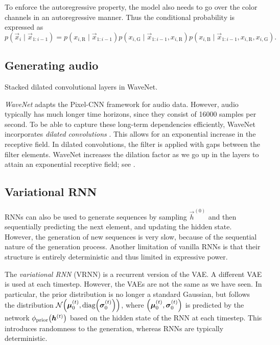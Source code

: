 To enforce the autoregressive property, the model also needs to go over the color channels in an
autoregressive manner. Thus the conditional probability is expressed as \[
    p(\vec{x}_i \mid \vec{x}_{1:i-1}) = p(x_{i,\mathrm{R}} \mid \vec{x}_{1:i-1}) p(x_{i,\mathrm{G}} \mid \vec{x}_{1:i-1}, x_{i,\mathrm{R}}) p(x_{i,\mathrm{B}} \mid \vec{x}_{1:i-1}, x_{i,\mathrm{R}}, x_{i,\mathrm{G}}).
\]

\subsection{Generating audio}

\begin{marginfigure}
    \centering
    \caption{Stacked dilated convolutional layers in WaveNet.}
    \label{fig:dilated-convolutions}
\end{marginfigure}

\textit{WaveNet} \citep{oord2016wavenet} adapts the Pixel-CNN framework for audio data. However,
audio typically has much longer time horizons, since they consist of 16000 samples per second. To be
able to capture these long-term dependencies efficiently, WaveNet incorporates \textit{dilated
    convolutions} \citep{yu2016multiscale}. This allows for an exponential increase in the receptive
field. In dilated convolutions, the filter is applied with gaps between the filter elements. WaveNet
increases the dilation factor as we go up in the layers to attain an exponential receptive field; see
.

\subsection{Variational RNN}

RNNs can also be used to generate sequences by sampling $\vec{h}^{(0)}$ and then sequentially
predicting the next element, and updating the hidden state. However, the generation of new
sequences is very slow, because of the sequential nature of the generation process. Another
limitation of vanilla RNNs is that their structure is entirely deterministic and thus limited in
expressive power.

The \textit{variational RNN} \citep{chung2015recurrent} (VRNN) is a recurrent version of the VAE. A
different VAE is used at each timestep. However, the VAEs are not the same as we have seen. In
particular, the prior distribution is no longer a standard Gaussian, but follows the distribution
$\mathcal{N}\lft(\vec{\mu}_0^{(t)}, \mathrm{diag}\lft(\vec{\sigma}_0^{(t)}\rgt)\rgt)$, where
$\lft(\vec{\mu}_0^{(t)}, \vec{\sigma}_0^{(t)}\rgt)$ is predicted by the network
$\phi_{\mathrm{prior}}\lft(\vec{h}^{(t)}\rgt)$ based on the hidden state of the RNN at each
timestep. This introduces randomness to the generation, whereas RNNs are typically deterministic.

